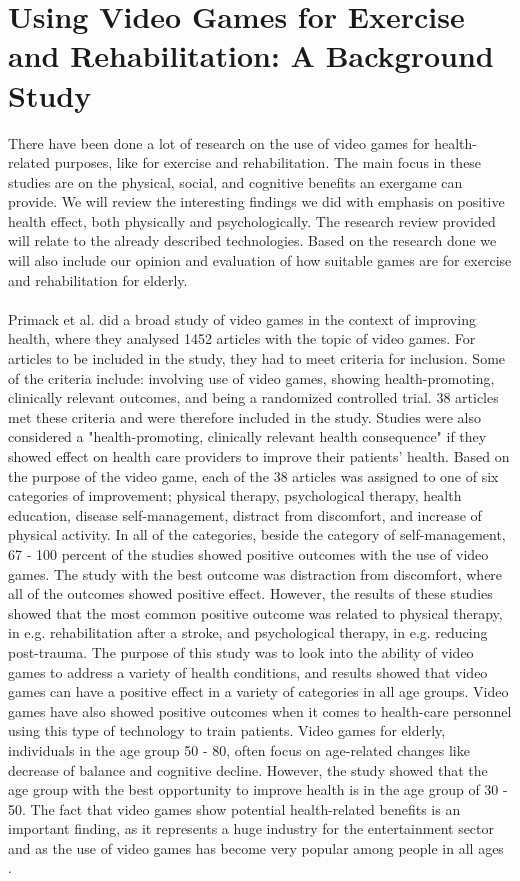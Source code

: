 \section{Using Video Games for Exercise and Rehabilitation: A Background Study}
There have been done a lot of research on the use of video games for health-related purposes, like for exercise and rehabilitation. The main focus in these studies are on the physical, social, and cognitive benefits an exergame can provide. We will review the interesting findings we did with emphasis on positive health effect, both physically and psychologically. The research review provided will relate to the already described technologies. Based on the research done we will also include our opinion and evaluation of how suitable games are for exercise and rehabilitation for elderly. \\ \\
Primack et al. \cite{roleofvideogames} did a broad study of video games in the context of improving health, where they analysed 1452 articles with the topic of video games.  For articles to be included in the study, they had to meet criteria for inclusion. Some of the criteria include: involving use of video games, showing health-promoting, clinically relevant outcomes, and being a randomized controlled trial. 38 articles met these criteria and were therefore included in the study. Studies were also considered a "health-promoting, clinically relevant health consequence" if they showed effect on health care providers to improve their patients' health. Based on the purpose of the video game, each of the 38 articles was assigned to one of six categories of improvement; physical therapy, psychological therapy, health education, disease self-management, distract from discomfort, and increase of physical activity. In all of the categories, beside the category of self-management, 67 - 100 percent of the studies showed positive outcomes with the use of video games. The study with the best outcome was distraction from discomfort, where all of the outcomes showed positive effect. However, the results of these studies showed that the most common positive outcome was related to physical therapy, in e.g. rehabilitation after a stroke, and psychological therapy, in e.g. reducing post-trauma. The purpose of this study was to look into the ability of video games to address a variety of health conditions, and results showed that video games can have a positive effect in a variety of categories in all age groups. Video games have also showed positive outcomes when it comes to health-care personnel using this type of technology to train patients. Video games for elderly, individuals in the age group 50 - 80, often focus on age-related changes like decrease of balance and cognitive decline. However, the study showed that the age group with the best opportunity to improve health is in the age group of 30 - 50. The fact that video games show potential health-related benefits is an important finding, as it represents a huge industry for the entertainment sector and as the use of video games has become very popular among people in all ages \cite{roleofvideogames}. \\ \\
